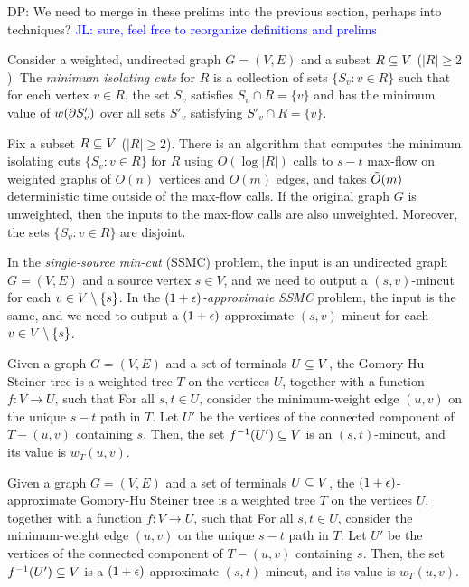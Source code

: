 \alert{DP: We need to merge in these prelims into the previous section, perhaps into techniques?} \textcolor{blue}{JL: sure, feel free to reorganize definitions and prelims}

Consider a weighted, undirected graph $G=(V,E)$ and a subset $R\subseteq V$ ($|R|\ge2$). The \emph{minimum isolating cuts} for $R$ is a collection of sets $\{S_v:v\in R\}$ such that for each vertex $v\in R$, the set $S_v$ satisfies $S_v\cap R=\{v\}$ and has the minimum value of $w(\partial S'_v)$ over all sets $S'_v$ satisfying $S'_v\cap R=\{v\}$.
\ED


\BL
Fix a subset $R\subseteq V$ ($|R|\ge2$). There is an algorithm that computes the minimum isolating cuts $\{S_v:v\in R\}$ for $R$ using $O(\log|R|)$ calls to $s-t$ max-flow on weighted graphs of $O(n)$ vertices and $O(m)$ edges, and takes $\tilde{O}(m)$ deterministic time outside of the max-flow calls. If the original graph $G$ is unweighted, then the inputs to the max-flow calls are also unweighted. Moreover, the sets $\{S_v:v\in R\}$ are disjoint.
\EL


In the \emph{single-source min-cut} (SSMC) problem, the input is an undirected graph $G=(V,E)$ and a source vertex $s\in V$, and we need to output a $(s,v)$-mincut for each $v\in V\setminus \{s\}$. In the \emph{$(1+\epsilon)$-approximate SSMC} problem, the input is the same, and we need to output a $(1+\epsilon)$-approximate $(s,v)$-mincut for each $v\in V\setminus \{s\}$.
\ED


Given a graph $G=(V,E)$ and a set of terminals $U\subseteq V$, the Gomory-Hu Steiner tree is a weighted tree $T$ on the vertices $U$, together with a function $f:V\to U$, such that
 \BI
 \im For all $s,t\in U$, consider the minimum-weight edge $(u,v)$ on the unique $s-t$ path in $T$. Let $U'$ be the vertices of the connected component of $T-(u,v)$ containing $s$.
Then, the set $f^{-1}(U')\subseteq V$ is an $(s,t)$-mincut, and its value is $w_T(u,v)$.
 \EI
\ED

Given a graph $G=(V,E)$ and a set of terminals $U\subseteq V$, the $(1+\epsilon)$-approximate Gomory-Hu Steiner tree is a weighted tree $T$ on the vertices $U$, together with a function $f:V\to U$, such that
 \BI
 \im For all $s,t\in U$, consider the minimum-weight edge $(u,v)$ on the unique $s-t$ path in $T$. Let $U'$ be the vertices of the connected component of $T-(u,v)$ containing $s$.
Then, the set $f^{-1}(U')\subseteq V$ is a $(1+\epsilon)$-approximate $(s,t)$-mincut, and its value is $w_T(u,v)$.
 \EI
\ED

